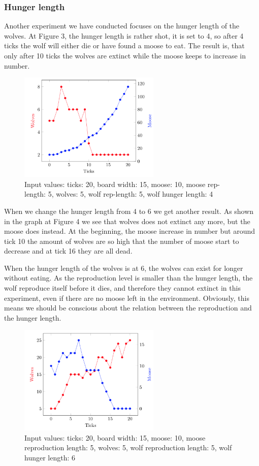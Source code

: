 \documentclass[a4paper]{report}
\begin{document}
\subsubsection*{Hunger length}

Another experiment we have conducted focuses on the hunger length of the wolves. At Figure 3, the hunger length is rather shot, it is set to 4, so after 4 ticks the wolf will either die or have found a moose to eat. The result is, that only after 10 ticks the wolves are extinct while the moose keeps to increase in number.
\begin{figure}[H]
\centering
\includegraphics[width=0.60\textwidth]{Experiments/sim_hunlen_a1}
\caption{Input values: ticks: 20, board width: 15, moose: 10, moose rep-length: 5, wolves: 5, wolf rep-length: 5, wolf hunger length: 4}
\end{figure}

When we change the hunger length from 4 to 6 we get another result. As shown in the graph at Figure 4 we see that wolves does not extinct any more, but the moose does instead. At the beginning, the moose increase in number but around tick 10 the amount of wolves are so high that the number of moose start to decrease and at tick 16 they are all dead.

When the hunger length of the wolves is at 6, the wolves can exist for longer without eating. As the reproduction level is smaller than the hunger length, the wolf reproduce itself before it dies, and therefore they cannot extinct in this experiment, even if there are no moose left in the environment. Obviously, this means we should be conscious about the relation between the reproduction and the hunger length.

\begin{figure}[H]
\centering
\includegraphics[width=0.60\textwidth]{Experiments/sim_hunlen_a2}
\caption{Input values: ticks: 20, board width: 15, moose: 10, moose reproduction length: 5, wolves: 5, wolf reproduction length: 5, wolf hunger length: 6}
\end{figure}
\end{document}
